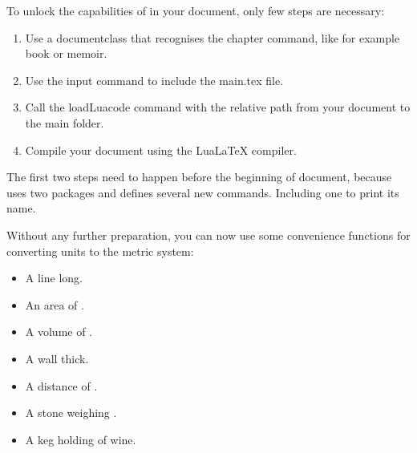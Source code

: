\documentclass{book}
\begin{document}
To unlock the capabilities of \LoreTex{} in your document, only few steps are necessary:
\begin{enumerate}
\item Use a documentclass that recognises the chapter command, like for example book or memoir.
\item Use the input command to include the main.tex file.
\item Call the loadLuacode command with the relative path from your document to the main folder.
\item Compile your document using the Lua\LaTeX{} compiler.
\end{enumerate}

The first two steps need to happen before the beginning of document, because \LoreTex{} uses two packages and defines several new commands. Including one to print its name.

Without any further preparation, you can now use some convenience functions for converting units to the metric system:
\begin{itemize}
\item A line  long.
\item An area of .
\item A volume of .
\item A wall  thick.
\item A distance of .
\item A stone weighing .
\item A keg holding  of wine.
\end{itemize}
\end{document}
